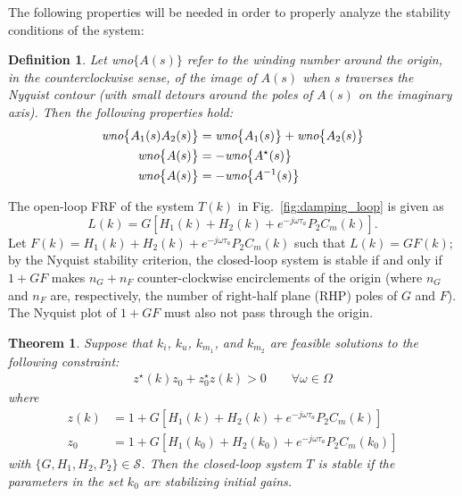 \documentclass[a4paper, 10pt, conference]{ieeeconf}
\newtheorem{theorem}{Theorem}
\newtheorem{definition}{Definition}
\begin{document}
The following properties will be needed in order to properly analyze the stability conditions of the system:
\begin{definition}
Let \emph{wno}$\{ A(s)\}$ refer to the winding number around the origin, in the counterclockwise sense, of the image of $A(s)$  when $s$ traverses the Nyquist contour (with small detours around the poles of $A(s)$ on the imaginary axis). Then the following properties hold:
\begin{align}
\emph{wno}\bigl\{ A_1(s)A_2(s) \bigr\} &= \emph{wno}\bigl\{ A_1(s) \bigr\} + \emph{wno}\bigl\{ A_2(s) \bigr\}  \label{eq:wno_add}\\ 
\emph{wno}\bigl\{ A(s)\bigr\} &= -\emph{wno}\bigl\{ A^{\star}(s)\bigr\} \label{eq:wno_conj} \\ 
\emph{wno}\bigl\{ A(s)\bigr\} &= -\emph{wno}\bigl\{ A^{-1}(s)\bigr\} \label{eq:wno_inv}
\end{align}
\end{definition}
The open-loop FRF of the system $T(k)$ in Fig.~\ref{fig:damping_loop} is given as $$L(k) = G[H_1(k)+H_2(k)+e^{-j\omega \tau_{a}}P_2C_m(k)].$$ Let $F(k) = H_1(k)+H_2(k)+e^{-j\omega \tau_{a}}P_2C_m(k)$ such that $L(k) = GF(k)$; by the Nyquist stability criterion, the closed-loop system is stable if and only if $1+GF$ makes $n_{G}+n_F$ counter-clockwise encirclements of the origin (where $n_{G}$ and $n_F$ are, respectively, the number of right-half plane (RHP) poles of $G$ and $F$). The Nyquist plot of $1+GF$ must also not pass through the origin.

\begin{theorem} \label{Thm1}
Suppose that $k_i$, $k_u$, $k_{m_1}$, and $k_{m_2}$ are feasible solutions to the following constraint:
\begin{equation} \label{eq:theorem1_cond}
\begin{split}
z^{\star}(k)z_0+z_0^{\star}z(k) > 0 \qquad 
\forall \omega \in \Omega
\end{split}
\end{equation}
where 
\begin{align*}
z(k) &= 1+G[H_1(k)+H_2(k)+e^{-j\omega \tau_{a}}P_2C_m(k)] \\
z_0 &= 1+G[H_1(k_0)+H_2(k_0)+e^{-j\omega \tau_{a}}P_2C_m(k_0)]
\end{align*}
with $\{G,H_1,H_2,P_2\} \in \mathscr{S}$. Then the closed-loop system $T$ is stable if the parameters in the set $k_0$ are stabilizing initial gains.
\end{theorem}
\end{document}
